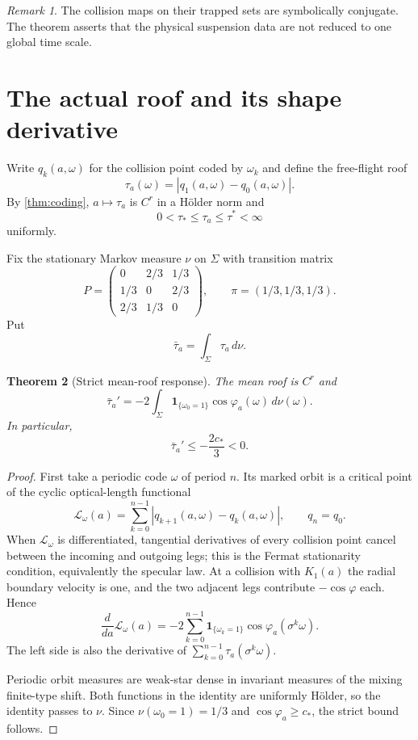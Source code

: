 \documentclass[11pt,reqno]{amsart}
\newtheorem{theorem}{Theorem}[section]
\theoremstyle{definition}
\theoremstyle{remark}
\newtheorem{remark}[theorem]{Remark}
\newcommand{\abs}[1]{\left\lvert #1\right\rvert}
\begin{document}
\begin{remark}
The collision maps on their trapped sets are symbolically conjugate.  The
theorem asserts that the physical suspension data are not reduced to one
global time scale.
\end{remark}

\section{The actual roof and its shape derivative}\label{sec:roof}

Write $q_k(a,\omega)$ for the collision point coded by $\omega_k$ and define
the free-flight roof
\[
 \tau_a(\omega)=
 \abs{q_1(a,\omega)-q_0(a,\omega)}.
\]
By \cref{thm:coding}, $a\mapsto\tau_a$ is $C^r$ in a Hölder norm and
\[
 0<\tau_*\le\tau_a\le\tau^*<\infty
\]
uniformly.

Fix the stationary Markov measure $\nu$ on $\Sigma$ with transition matrix
\[
 P=\begin{pmatrix}
 0&2/3&1/3\\
 1/3&0&2/3\\
 2/3&1/3&0
 \end{pmatrix},
 \qquad \pi=(1/3,1/3,1/3).
\]
Put
\[
 \bar\tau_a=\int_\Sigma\tau_a\,d\nu.
\]

\begin{theorem}[Strict mean-roof response]\label{thm:roof-response}
The mean roof is $C^r$ and
\begin{equation}\label{eq:roof-response}
 \bar\tau_a'
 =
 -2\int_\Sigma
 \mathbf 1_{\{\omega_0=1\}}
 \cos\varphi_a(\omega)\,d\nu(\omega).
\end{equation}
In particular,
\[
 \bar\tau_a'\le-\frac{2c_*}{3}<0.
\]
\end{theorem}

\begin{proof}
First take a periodic code $\omega$ of period $n$.  Its marked orbit is a
critical point of the cyclic optical-length functional
\[
 \mathcal L_\omega(a)
 =\sum_{k=0}^{n-1}
 \abs{q_{k+1}(a,\omega)-q_k(a,\omega)},\qquad q_n=q_0.
\]
When $\mathcal L_\omega$ is differentiated, tangential derivatives of every
collision point cancel between the incoming and outgoing legs; this is the
Fermat stationarity condition, equivalently the specular law.  At a collision
with $K_1(a)$ the radial boundary velocity is one, and the two adjacent legs
contribute $-\cos\varphi$ each.  Hence
\[
 \frac{d}{da}\mathcal L_\omega(a)
 =
 -2\sum_{k=0}^{n-1}
 \mathbf 1_{\{\omega_k=1\}}
 \cos\varphi_a(\sigma^k\omega).
\]
The left side is also the derivative of
$\sum_{k=0}^{n-1}\tau_a(\sigma^k\omega)$.

Periodic orbit measures are weak-star dense in invariant measures of the
mixing finite-type shift.  Both functions in the identity are uniformly
Hölder, so the identity passes to $\nu$.  Since
$\nu(\omega_0=1)=1/3$ and $\cos\varphi_a\ge c_*$, the strict bound follows.
\end{proof}
\end{document}
